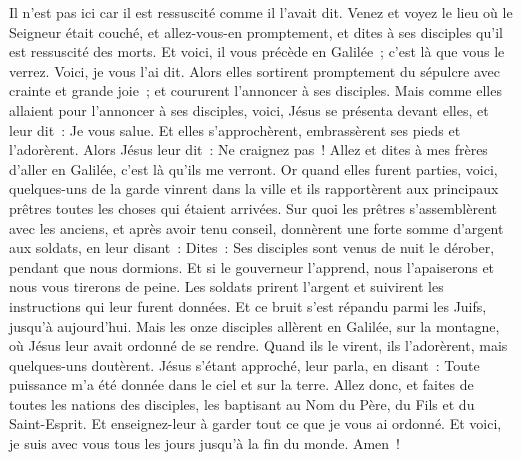 \begin{multicols}{2}
Il n'est pas ici car il est ressuscité comme il l'avait dit. Venez et voyez le lieu où le Seigneur était couché,
et allez-vous-en promptement, et dites à ses disciples qu'il est ressuscité des morts. Et voici, il vous précède en Galilée~; c'est là que vous le verrez. Voici, je vous l'ai dit.
Alors elles sortirent promptement du sépulcre avec crainte et grande joie~; et coururent l'annoncer à ses disciples.
Mais comme elles allaient pour l'annoncer à ses disciples, voici, Jésus se présenta devant elles, et leur dit~: Je vous salue. Et elles s'approchèrent, embrassèrent ses pieds et l'adorèrent.
Alors Jésus leur dit~: Ne craignez pas~! Allez et dites à mes frères d'aller en Galilée, c'est là qu'ils me verront.
 Or quand elles furent parties, voici, quelques-uns de la garde vinrent dans la ville et ils rapportèrent aux principaux prêtres toutes les choses qui étaient arrivées.
Sur quoi les prêtres s'assemblèrent avec les anciens, et après avoir tenu conseil, donnèrent une forte somme d'argent aux soldats,
en leur disant~: Dites~: Ses disciples sont venus de nuit le dérober, pendant que nous dormions.
Et si le gouverneur l'apprend, nous l'apaiserons et nous vous tirerons de peine.
Les soldats prirent l'argent et suivirent les instructions qui leur furent données. Et ce bruit s'est répandu parmi les Juifs, jusqu'à aujourd'hui.
Mais les onze disciples allèrent en Galilée, sur la montagne, où Jésus leur avait ordonné de se rendre.
Quand ils le virent, ils l'adorèrent, mais quelques-uns doutèrent.
Jésus s'étant approché, leur parla, en disant~: Toute puissance m'a été donnée dans le ciel et sur la terre.
Allez donc, et faites de toutes les nations des disciples, les baptisant au Nom du Père, du Fils et du Saint-Esprit.
Et enseignez-leur à garder tout ce que je vous ai ordonné. Et voici, je suis avec vous tous les jours jusqu'à la fin du monde. Amen~!
\PPE{}
\end{multicols}
